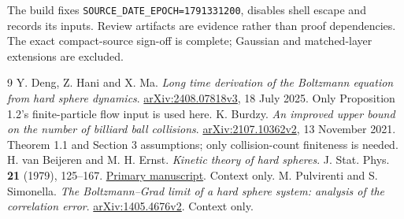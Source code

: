 \documentclass[11pt,letterpaper]{article}
\theoremstyle{remark}\newtheorem{remark}[theorem]{Remark}
\numberwithin{equation}{section}
\begin{document}
The build fixes \texttt{SOURCE\_DATE\_EPOCH=1791331200}, disables shell escape and records its inputs. Review artifacts are evidence rather than proof dependencies. The exact compact-source sign-off is complete; Gaussian and matched-layer extensions are excluded.

\begin{thebibliography}{9}\small
{} Y. Deng, Z. Hani and X. Ma. \emph{Long time derivation of the Boltzmann equation from hard sphere dynamics}. \href{https://arxiv.org/abs/2408.07818v3}{arXiv:2408.07818v3}, 18 July 2025. Only Proposition 1.2's finite-particle flow input is used here.
 K. Burdzy. \emph{An improved upper bound on the number of billiard ball collisions}. \href{https://arxiv.org/abs/2107.10362v2}{arXiv:2107.10362v2}, 13 November 2021. Theorem 1.1 and Section 3 assumptions; only collision-count finiteness is needed.
 H. van Beijeren and M. H. Ernst. \emph{Kinetic theory of hard spheres}. J. Stat. Phys. \textbf{21} (1979), 125--167. \href{https://www.phys.uu.nl/~vanbeije/pub/KinThHS.pdf}{Primary manuscript}. Context only.
 M. Pulvirenti and S. Simonella. \emph{The Boltzmann--Grad limit of a hard sphere system: analysis of the correlation error}. \href{https://arxiv.org/abs/1405.4676v2}{arXiv:1405.4676v2}. Context only.
\end{thebibliography}
\end{document}
